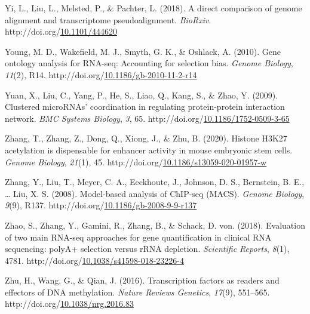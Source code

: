 \documentclass[12pt,twoside]{reedthesis}
\newlength{\cslhangindent}
\newenvironment{CSLReferences}[2] %
 {%
  \setlength{\parindent}{0pt}
  \ifodd #1 \everypar{\setlength{\hangindent}{\cslhangindent}}\ignorespaces\fi
  \ifnum #2 > 0
  \setlength{\parskip}{#2\baselineskip}
  \fi
 }%
 {}
\begin{document}
\begin{CSLReferences}{1}{0}
\leavevmode{}%
Yi, L., Liu, L., Melsted, P., \& Pachter, L. (2018). A direct comparison of genome alignment and transcriptome pseudoalignment. \emph{BioRxiv}. http://doi.org/\href{https://doi.org/10.1101/444620}{10.1101/444620}

\leavevmode{}%
Young, M. D., Wakefield, M. J., Smyth, G. K., \& Oshlack, A. (2010). Gene ontology analysis for RNA-seq: Accounting for selection bias. \emph{Genome Biology}, \emph{11}(2), R14. http://doi.org/\href{https://doi.org/10.1186/gb-2010-11-2-r14}{10.1186/gb-2010-11-2-r14}

\leavevmode{}%
Yuan, X., Liu, C., Yang, P., He, S., Liao, Q., Kang, S., \& Zhao, Y. (2009). Clustered microRNAs' coordination in regulating protein-protein interaction network. \emph{BMC Systems Biology}, \emph{3}, 65. http://doi.org/\href{https://doi.org/10.1186/1752-0509-3-65}{10.1186/1752-0509-3-65}

\leavevmode{}%
Zhang, T., Zhang, Z., Dong, Q., Xiong, J., \& Zhu, B. (2020). Histone H3K27 acetylation is dispensable for enhancer activity in mouse embryonic stem cells. \emph{Genome Biology}, \emph{21}(1), 45. http://doi.org/\href{https://doi.org/10.1186/s13059-020-01957-w}{10.1186/s13059-020-01957-w}

\leavevmode{}%
Zhang, Y., Liu, T., Meyer, C. A., Eeckhoute, J., Johnson, D. S., Bernstein, B. E., \ldots{} Liu, X. S. (2008). Model-based analysis of ChIP-seq (MACS). \emph{Genome Biology}, \emph{9}(9), R137. http://doi.org/\href{https://doi.org/10.1186/gb-2008-9-9-r137}{10.1186/gb-2008-9-9-r137}

\leavevmode{}%
Zhao, S., Zhang, Y., Gamini, R., Zhang, B., \& Schack, D. von. (2018). Evaluation of two main {RNA}-seq approaches for gene quantification in clinical {RNA} sequencing: {polyA}+ selection versus {rRNA} depletion. \emph{Scientific Reports}, \emph{8}(1), 4781. http://doi.org/\href{https://doi.org/10.1038/s41598-018-23226-4}{10.1038/s41598-018-23226-4}

\leavevmode{}%
Zhu, H., Wang, G., \& Qian, J. (2016). Transcription factors as readers and effectors of DNA methylation. \emph{Nature Reviews Genetics}, \emph{17}(9), 551--565. http://doi.org/\href{https://doi.org/10.1038/nrg.2016.83}{10.1038/nrg.2016.83}


\end{CSLReferences}
\end{document}
